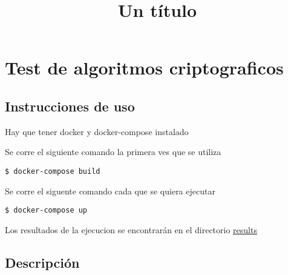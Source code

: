 \documentclass{IEEEtran}
\begin{document}
\title{Un título    }
\author{
  }

\maketitle{}

\tableofcontents{}

\hypertarget{test-de-algoritmos-criptograficos}{%
  \section{Test de algoritmos
    criptograficos}\label{test-de-algoritmos-criptograficos}}

\hypertarget{instrucciones-de-uso}{%
  \subsection{Instrucciones de uso}\label{instrucciones-de-uso}}

Hay que tener docker y docker-compose instalado

Se corre el siguiente comando la primera ves que se utiliza

\begin{verbatim}
$ docker-compose build
\end{verbatim}

Se corre el siguente comando cada que se quiera ejecutar

\begin{verbatim}
$ docker-compose up
\end{verbatim}

Los resultados de la ejecucion se encontrarán en el directorio
\href{./results}{results}

\hypertarget{descripciuxf3n}{%
  \subsection{Descripción}\label{descripciuxf3n}}
\end{document}

